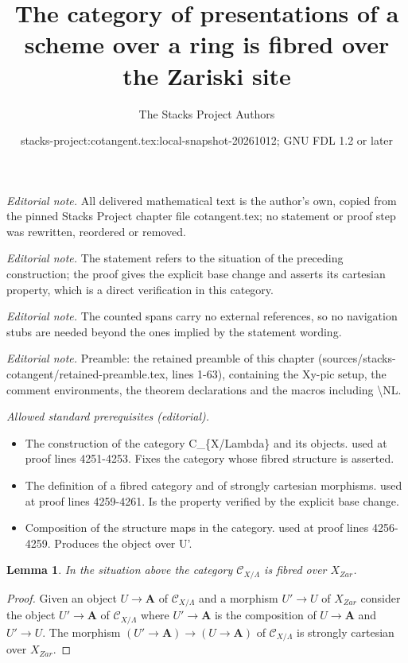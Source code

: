 \documentclass[10pt,a4paper]{amsart}
\title{The category of presentations of a scheme over a ring is fibred over the Zariski site}
\author{The Stacks Project Authors}
\date{stacks-project:cotangent.tex:local-snapshot-20261012; GNU FDL 1.2 or later}
\theoremstyle{plain}
\newtheorem{lemma}[subsection]{Lemma}
\theoremstyle{definition}
\theoremstyle{remark}
\numberwithin{equation}{subsection}
\begin{document}
\maketitle
\setcounter{subsection}{1}
\noindent\textit{Editorial note.} All delivered mathematical text is the author's own, copied from the pinned Stacks Project chapter file cotangent.tex; no statement or proof step was rewritten, reordered or removed.\par\medskip
\noindent\textit{Editorial note.} The statement refers to the situation of the preceding construction; the proof gives the explicit base change and asserts its cartesian property, which is a direct verification in this category.\par\medskip
\noindent\textit{Editorial note.} The counted spans carry no external references, so no navigation stubs are needed beyond the ones implied by the statement wording.\par\medskip
\noindent\textit{Editorial note.} Preamble: the retained preamble of this chapter (sources/stacks-cotangent/retained-preamble.tex, lines 1-63), containing the Xy-pic setup, the comment environments, the theorem declarations and the macros including \textbackslash{}NL.\par\medskip
\noindent\textit{Allowed standard prerequisites (editorial).}\begin{itemize}
\item The construction of the category C\_\{X/Lambda\} and its objects. used at proof lines 4251-4253. Fixes the category whose fibred structure is asserted.
\item The definition of a fibred category and of strongly cartesian morphisms. used at proof lines 4259-4261. Is the property verified by the explicit base change.
\item Composition of the structure maps in the category. used at proof lines 4256-4259. Produces the object over U'.
\end{itemize}\medskip
\begin{lemma}
\label{lemma-category-fibred}
In the situation above the category
$\mathcal{C}_{X/\Lambda}$ is fibred over $X_{Zar}$.
\end{lemma}

\begin{proof}
Given an object $U \to \mathbf{A}$ of $\mathcal{C}_{X/\Lambda}$ and a morphism
$U' \to U$ of $X_{Zar}$ consider the object $U' \to \mathbf{A}$ of
$\mathcal{C}_{X/\Lambda}$ where $U' \to \mathbf{A}$ is the composition of
$U \to \mathbf{A}$ and $U' \to U$. The morphism
$(U' \to \mathbf{A}) \to (U \to \mathbf{A})$ of
$\mathcal{C}_{X/\Lambda}$ is strongly cartesian over $X_{Zar}$.
\end{proof}
\end{document}
